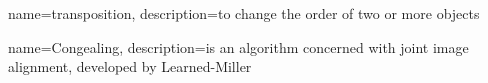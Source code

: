 \makeglossaries

{
    name=transposition,
    description={to change the order of two or more objects}
}






{
    name=Congealing,
    description={is an algorithm concerned with joint image alignment, developed by Learned-Miller \cite{joint-alignment}}
}
